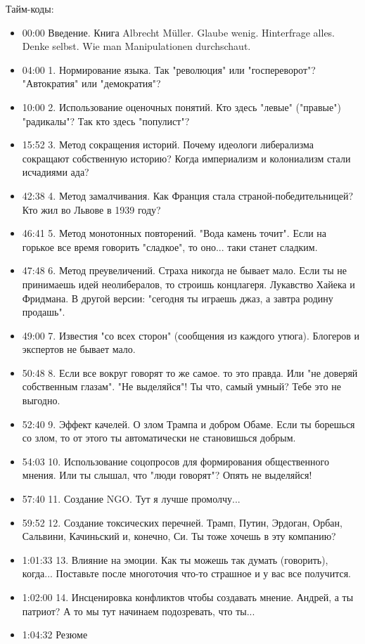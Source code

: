 \begin{itemize}
Тайм-коды: 

\begin{itemize}
  \item 00:00 Введение. Книга Albrecht Müller. Glaube wenig. Hinterfrage alles. Denke selbst. Wie man Manipulationen durchschaut. 
  \item 04:00 1. Нормирование языка. Так "революция" или "госпереворот"? "Автократия" или "демократия"? 
  \item 10:00 2. Использование оценочных понятий. Кто здесь "левые" ("правые") "радикалы"? Так кто здесь "популист"? 
  \item 15:52 3. Метод сокращения историй. Почему идеологи либерализма сокращают собственную историю? Когда империализм и колониализм стали исчадиями ада? 
  \item 42:38 4. Метод замалчивания. Как Франция стала страной-победительницей? Кто жил во Львове в 1939 году? 
  \item 46:41 5. Метод монотонных повторений. "Вода камень точит". Если на горькое все время говорить "сладкое", то оно... таки станет сладким. 
  \item 47:48 6. Метод преувеличений. Страха никогда не бывает мало. Если ты не принимаешь идей неолибералов, то строишь концлагеря. Лукавство Хайека и Фридмана. В другой версии: "сегодня ты играешь джаз, а завтра родину продашь". 
  \item 49:00 7. Известия "со всех сторон" (сообщения из каждого утюга). Блогеров и экспертов не бывает мало. 
  \item 50:48 8. Если все вокруг говорят то же самое. то это правда. Или "не доверяй собственным глазам". "Не выделяйся"! Ты что, самый умный? Тебе это не выгодно. 
  \item 52:40 9. Эффект качелей. О злом Трампа и добром Обаме. Если ты борешься со злом, то от этого ты автоматически не становишься добрым. 
  \item 54:03 10. Использование соцопросов для формирования общественного мнения. Или ты слышал, что "люди говорят"? Опять не выделяйся! 
  \item 57:40 11. Создание NGO. Тут я лучше промолчу... 
  \item 59:52 12. Создание токсических перечней. Трамп, Путин, Эрдоган, Орбан, Сальвини, Качиньский и, конечно, Си. Ты тоже хочешь в эту компанию? 
  \item 1:01:33 13. Влияние на эмоции. Как ты можешь так думать (говорить), когда... Поставьте после многоточия что-то страшное и у вас все получится. 
  \item 1:02:00 14. Инсценировка конфликтов чтобы создавать мнение. Андрей, а ты патриот? А то мы тут начинаем подозревать, что ты...
  \item 1:04:32 Резюме
\end{itemize}


\end{itemize}
